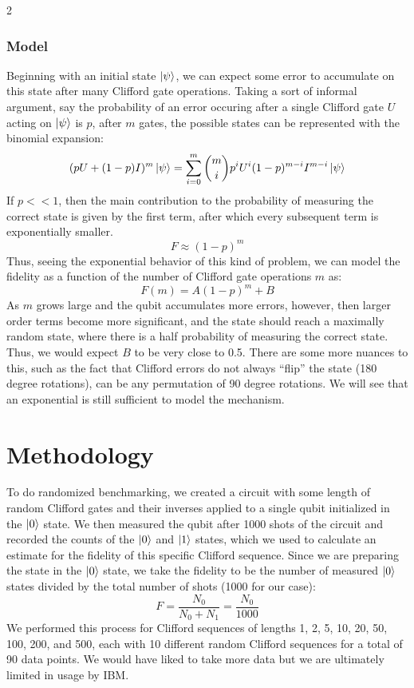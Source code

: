 \documentclass{article}
\begin{document}
\begin{multicols}{2}
\subsubsection{Model}
Beginning with an initial state $\ket{\psi}$, we can expect some error to accumulate on this state after many Clifford gate operations. Taking a sort of informal argument, say the probability of an error occuring after a single Clifford gate $U$ acting on $\ket{\psi}$ is $p$, after $m$ gates, the possible states can be represented with the binomial expansion:
\[(pU + (1-p)I)^m \ket{\psi} = \sum_{i=0}^m {m\choose i} p^i U^i (1-p)^{m-i} I^{m-i} \ket{\psi}\]
If $p<<1$, then the main contribution to the probability of measuring the correct state is given by the first term, after which every subsequent term is exponentially smaller. 
\[F \approx (1-p)^m\]
Thus, seeing the exponential behavior of this kind of problem, we can model the fidelity as a function of the number of Clifford gate operations $m$ as:
\[F(m) = A (1-p)^m + B\]
As $m$ grows large and the qubit accumulates more errors, however, then larger order terms become more significant, and the state should reach a maximally random state, where there is a half probability of measuring the correct state. Thus, we would expect $B$ to be very close to 0.5. There are some more nuances to this, such as the fact that Clifford errors do not always ``flip'' the state (180 degree rotations), can be any permutation of 90 degree rotations. We will see that an exponential is still sufficient to model the mechanism.

\section{Methodology}
To do randomized benchmarking, we created a circuit with some length of random Clifford gates and their inverses applied to a single qubit initialized in the $\ket{0}$ state. We then measured the qubit after 1000 shots of the circuit and recorded the counts of the $\ket{0}$ and $\ket{1}$ states, which we used to calculate an estimate for the fidelity of this specific Clifford sequence. Since we are preparing the state in the $\ket{0}$ state, we take the fidelity to be the number of measured $\ket{0}$ states divided by the total number of shots (1000 for our case):
\[F = \frac{N_0}{N_0 + N_1} = \frac{N_0}{1000}\]
We performed this process for Clifford sequences of lengths 1, 2, 5, 10, 20, 50, 100, 200, and 500, each with 10 different random Clifford sequences for a total of 90 data points. We would have liked to take more data but we are ultimately limited in usage by IBM.


\end{multicols}
\end{document}
